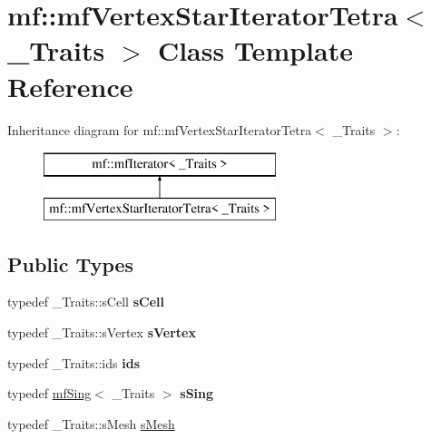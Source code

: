 \hypertarget{classmf_1_1mfVertexStarIteratorTetra}{
\section{mf::mfVertexStarIteratorTetra$<$ \_\-Traits $>$ Class Template Reference}
\label{classmf_1_1mfVertexStarIteratorTetra}
}
Inheritance diagram for mf::mfVertexStarIteratorTetra$<$ \_\-Traits $>$:\begin{figure}[H]
\begin{center}
\leavevmode
\includegraphics[height=2.000000cm]{classmf_1_1mfVertexStarIteratorTetra}
\end{center}
\end{figure}
\subsection*{Public Types}
\begin{DoxyCompactItemize}
\item 
\hypertarget{classmf_1_1mfVertexStarIteratorTetra_a73b533ca825ea973adc15f25152d7d21}{
typedef \_\-Traits::sCell {\bfseries sCell}}
\label{classmf_1_1mfVertexStarIteratorTetra_a73b533ca825ea973adc15f25152d7d21}

\item 
\hypertarget{classmf_1_1mfVertexStarIteratorTetra_a16b199793bc6d31a78eed3fffc6644bd}{
typedef \_\-Traits::sVertex {\bfseries sVertex}}
\label{classmf_1_1mfVertexStarIteratorTetra_a16b199793bc6d31a78eed3fffc6644bd}

\item 
\hypertarget{classmf_1_1mfVertexStarIteratorTetra_a2641fe9f6c4e8a3682d56887b55ecda5}{
typedef \_\-Traits::ids {\bfseries ids}}
\label{classmf_1_1mfVertexStarIteratorTetra_a2641fe9f6c4e8a3682d56887b55ecda5}

\item 
\hypertarget{classmf_1_1mfVertexStarIteratorTetra_adae62d5d7d040a360c62f8529fb156bc}{
typedef \hyperlink{classmf_1_1mfSing}{mfSing}$<$ \_\-Traits $>$ {\bfseries sSing}}
\label{classmf_1_1mfVertexStarIteratorTetra_adae62d5d7d040a360c62f8529fb156bc}

\item 
typedef \_\-Traits::sMesh \hyperlink{classmf_1_1mfVertexStarIteratorTetra_a19a9aafec3afbbafea712fa9c1a3417e}{sMesh}
\end{DoxyCompactItemize}
